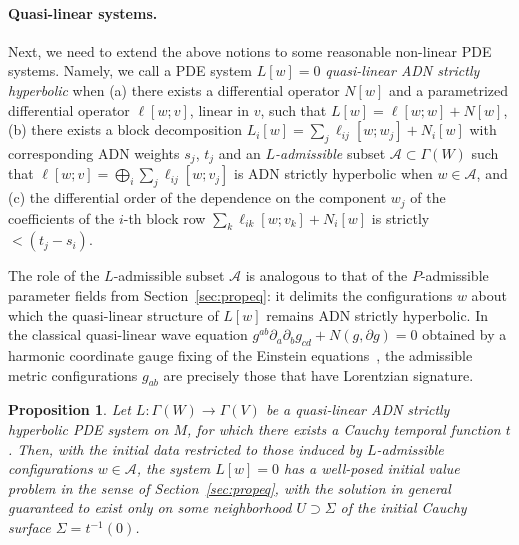 \documentclass[a4paper]{article}
\newtheorem{prp}[thm]{Proposition}
\theoremstyle{remark}
\newcommand{\Secs}{\Gamma}
\begin{document}
\paragraph{Quasi-linear systems.}
Next, we need to extend the above notions to some reasonable non-linear PDE
systems. Namely, we call a PDE system $L[w] = 0$ \emph{quasi-linear ADN
strictly hyperbolic} when (a) there exists a differential operator $N[w]$ and a
parametrized differential operator $\ell[w;v]$, linear in $v$, such that $L[w]
= \ell[w;w] + N[w]$, (b) there exists a block decomposition $L_i[w] = \sum_j
\ell_{ij}[w;w_j] + N_i[w]$ with corresponding ADN weights $s_j$, $t_j$ and an
\emph{$L$-admissible} subset $\mathcal{A} \subset \Secs(W)$ such that
$\ell[w;v] = \bigoplus_i \sum_j \ell_{ij}[w;v_j]$ is ADN strictly hyperbolic
when $w\in \mathcal{A}$, and (c) the differential order of the dependence on
the component $w_j$ of the coefficients of the $i$-th block row $\sum_k
\ell_{ik}[w;v_k] + N_i[w]$ is strictly $< (t_j-s_i)$.

The role of the $L$-admissible subset $\mathcal{A}$ is analogous to that of the
$P$-admissible parameter fields from Section~\ref{sec:propeq}: it delimits the
configurations $w$ about which the quasi-linear structure of $L[w]$ remains ADN
strictly hyperbolic. In the classical quasi-linear wave equation $g^{ab}
\partial_a \partial_b g_{cd} + N(g,\partial g) = 0$ obtained by a harmonic
coordinate gauge fixing of the Einstein
equations~\cite[Sec.14.1]{ringstrom-cauchy}, the admissible metric
configurations $g_{ab}$ are precisely those that have Lorentzian signature.

\begin{prp} \label{prp:adn-global-well-posed}
Let $L\colon \Secs(W) \to \Secs(V)$ be a quasi-linear ADN strictly hyperbolic PDE
system on $M$, for which there exists a Cauchy temporal function $t$. Then,
with the initial data restricted to those induced by $L$-admissible
configurations $w \in \mathcal{A}$, the system $L[w] = 0$ has a well-posed
initial value problem in the sense of Section~\ref{sec:propeq}, with the
solution in general guaranteed to exist only on some neighborhood $U \supset
\Sigma$ of the initial Cauchy surface $\Sigma = t^{-1}(0)$.
\end{prp}
\end{document}
